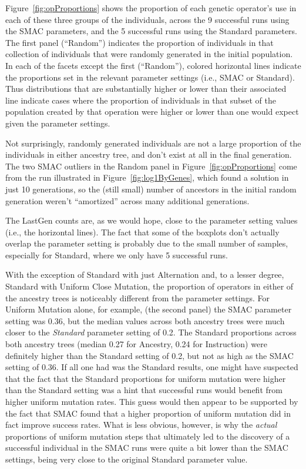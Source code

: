 Figure~\ref{fig:opProportions} shows the proportion of each genetic 
operator's use in each of these three groups of the individuals, across
the 9 successful runs using the SMAC parameters, and the 5 successful runs
using the Standard parameters. The first
panel (``Random'') indicates the proportion of individuals in that collection
of individuals that were randomly generated in the initial population. 
In each of
the facets except the first (``Random''), colored horizontal lines indicate
the proportions set in the relevant parameter settings (i.e., SMAC or
Standard). Thus distributions that are substantially higher or lower than
their associated line indicate cases where the proportion of individuals in
that subset of the population created by that operation were higher or
lower than one would expect given the parameter settings.

Not surprisingly, randomly generated individuals are not a large
proportion of the individuals in either ancestry tree, and don't exist
at all in the final generation. The two SMAC outliers in the Random panel in Figure~\ref{fig:opProportions} come from the run
illustrated in Figure~\ref{fig:log1ByGenes}, which found a solution in 
just 10 generations, so the (still small) number
of ancestors in the initial random generation weren't ``amortized''
across many additional generations.

The LastGen counts are, as we would hope, close to the parameter
setting values (i.e., the horizontal lines). The fact that some of the
boxplots don't actually overlap the parameter setting is probably due
to the small number of samples, especially for Standard, where we only
have 5 successful runs.

With the exception of Standard with just Alternation and, to a
lesser degree, Standard with Uniform Close Mutation, the proportion
of operators in either of the ancestry trees is noticeably
different from the parameter settings. For Uniform Mutation alone, for 
example, (the second panel) the SMAC parameter setting
was 0.36, but the median values across both ancestry trees were much closer to
the \emph{Standard} parameter setting of 0.2. The Standard proportions across
both ancestry trees (median 0.27 for Ancestry, 0.24 for Instruction) were definitely higher than the Standard setting of 0.2, but not as high as the
SMAC setting of 0.36. If all one had was the Standard results, one might 
have suspected that the fact that
the Standard proportions for uniform mutation were higher than the Standard
setting was a hint that successful runs would benefit from higher uniform
mutation rates. This guess would then appear to be supported by the fact
that SMAC found that a higher proportion of uniform mutation did in fact
improve success rates. What is less obvious, however, is why the \emph{actual}
proportions of uniform mutation steps that ultimately led to the discovery of
a successful individual in the SMAC runs were quite a bit lower than the SMAC
settings, being very close to the original Standard parameter value.

